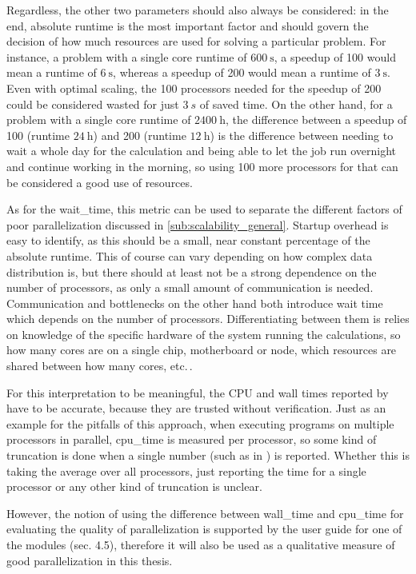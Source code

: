 \documentclass[main.tex]{subfiles}
\begin{document}
Regardless, the other two parameters should also always be considered: in the end, absolute runtime is the most important factor and should govern the decision of how much resources are used for solving a particular problem.
For instance, a problem with a single core runtime of \(\SI{600}{\s}\), a speedup of 100 would mean a runtime of \(\SI{6}{\s}\), whereas a speedup of 200 would mean a runtime of \(\SI{3}{\s}\).
Even with optimal scaling, the 100 processors needed for the speedup of 200 could be considered wasted for just \(\SI{3}{s}\) of saved time.
On the other hand, for a problem with a single core runtime of \(\SI{2400}{\hour}\), the difference between a speedup of 100 (runtime \(\SI{24}{\hour}\)) and 200 (runtime \(\SI{12}{\hour}\)) is the difference between needing to wait a whole day for the calculation and being able to let the job run overnight and continue working in the morning, so using 100 more processors for that can be considered a good use of resources.

As for the \gls{wait_time}, this metric can be used to separate the different factors of poor parallelization discussed in \ref{sub:scalability_general}.
Startup overhead is easy to identify, as this should be a small, near constant percentage of the absolute runtime.
This of course can vary depending on how complex data distribution is, but there should at least not be a strong dependence on the number of processors, as only a small amount of communication is needed.
Communication and bottlenecks on the other hand both introduce wait time which depends on the number of processors.
Differentiating between them is relies on knowledge of the specific hardware of the system running the calculations, so how many cores are on a single chip, motherboard or node, which resources are shared between how many cores, etc.\,.

For this interpretation to be meaningful, the CPU and wall times reported by \QE have to be accurate, because they are trusted without verification.
Just as an example for the pitfalls of this approach, when executing programs on multiple processors in parallel, \gls{cpu_time} is measured per processor, so some kind of truncation is done when a single number (such as in \QE) is reported.
Whether this is taking the average over all processors, just reporting the time for a single processor or any other kind of truncation is unclear.

However, the notion of using the difference between \gls{wall_time} and \gls{cpu_time} for evaluating the quality of parallelization is supported by the user guide for one of the \QE modules \cite{noauthor_pwscf_nodate} (sec. 4.5), therefore it will also be used as a qualitative measure of good parallelization in this thesis.
\end{document}
